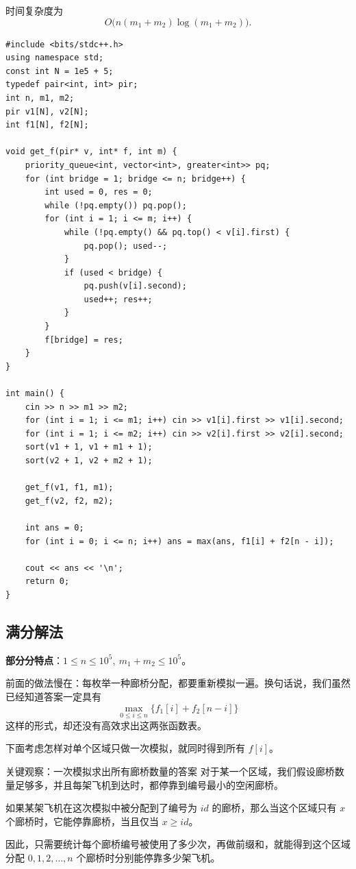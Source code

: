 \documentclass{book}
\begin{document}
时间复杂度为
\[
O\bigl(n(m_1+m_2)\log(m_1+m_2)\bigr).
\]
\newpage
\begin{lstlisting}[style = code]
#include <bits/stdc++.h>
using namespace std;
const int N = 1e5 + 5;
typedef pair<int, int> pir;
int n, m1, m2;
pir v1[N], v2[N];
int f1[N], f2[N];

void get_f(pir* v, int* f, int m) {
    priority_queue<int, vector<int>, greater<int>> pq;
    for (int bridge = 1; bridge <= n; bridge++) {
        int used = 0, res = 0;
        while (!pq.empty()) pq.pop();
        for (int i = 1; i <= m; i++) {
            while (!pq.empty() && pq.top() < v[i].first) {
                pq.pop(); used--;
            }
            if (used < bridge) {
                pq.push(v[i].second);
                used++; res++;
            }
        }
        f[bridge] = res;
    }
}

int main() {
    cin >> n >> m1 >> m2;
    for (int i = 1; i <= m1; i++) cin >> v1[i].first >> v1[i].second;
    for (int i = 1; i <= m2; i++) cin >> v2[i].first >> v2[i].second;
    sort(v1 + 1, v1 + m1 + 1);
    sort(v2 + 1, v2 + m2 + 1);

    get_f(v1, f1, m1);
    get_f(v2, f2, m2);

    int ans = 0;
    for (int i = 0; i <= n; i++) ans = max(ans, f1[i] + f2[n - i]);
    
    cout << ans << '\n';
    return 0;
}
\end{lstlisting}

\subsection{满分解法}

\textbf{部分分特点}：$1\le n\le 10^5,\ m_1+m_2\le 10^5$。

前面的做法慢在：每枚举一种廊桥分配，都要重新模拟一遍。换句话说，我们虽然已经知道答案一定具有
\[
\max_{0\le i\le n}\{f_1[i]+f_2[n-i]\}
\]
这样的形式，却还没有高效求出这两张函数表。

下面考虑怎样对单个区域只做一次模拟，就同时得到所有 $f[i]$。

\begin{keybox}{关键观察：一次模拟求出所有廊桥数量的答案}
对于某一个区域，我们假设廊桥数量足够多，并且每架飞机到达时，都停靠到编号最小的空闲廊桥。

如果某架飞机在这次模拟中被分配到了编号为 $id$ 的廊桥，那么当这个区域只有 $x$ 个廊桥时，它能停靠廊桥，当且仅当 $x\ge id$。

因此，只需要统计每个廊桥编号被使用了多少次，再做前缀和，就能得到这个区域分配 $0,1,2,\ldots,n$ 个廊桥时分别能停靠多少架飞机。
\end{keybox}
\end{document}
